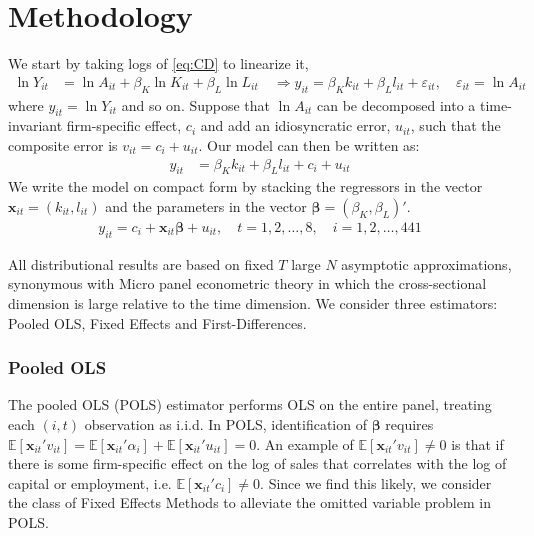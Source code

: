 \section{Methodology} \label{sec:methodology}

We start by taking logs of \eqref{eq:CD} to linearize it,
\begin{align*}
    \ln Y_{it} &= \ln A_{it} + \beta_K \ln K_{it} + \beta_L \ln L_{it} \quad \Longrightarrow
    y_{it} = \beta_K k_{it} + \beta_L l_{it} + \varepsilon_{it}, \quad \varepsilon_{it} = \ln A_{it}
\end{align*}
where $y_{it} = \ln Y_{it}$ and so on. Suppose that $\ln A_{it}$ can be decomposed into a time-invariant firm-specific effect, $c_i$ and add an idiosyncratic error, $u_{it}$, such that the composite error is $v_{it} = c_i + u_{it}$. Our model can then be written as:
\begin{align*}
    y_{it} &= \beta_K k_{it} + \beta_L l_{it}+c_i + u_{it}
\end{align*}
We write the model on compact form by stacking the regressors in the vector $\bm{x}_{it} = (k_{it}, l_{it})$ and the parameters in the vector $\bm{\beta} = (\beta_K, \beta_L)'$.
\begin{align} \label{equationline}
    y_{it} = c_i + \bm{x}_{it} \bm{\beta} + u_{it}, \quad t=1,2,\ldots,8, \quad i=1,2,\ldots,441
\end{align}

All distributional results are based on fixed $T$ large $N$ asymptotic approximations, synonymous with Micro panel econometric theory in which the cross-sectional dimension is large relative to the time dimension. We consider three estimators: Pooled OLS, Fixed Effects and First-Differences.  

\subsubsection*{Pooled OLS}
The pooled OLS (POLS) estimator performs OLS on the entire panel, treating each $(i,t)$ observation as i.i.d. In POLS, identification of $\pmb{\beta}$ requires  $\mathbb{E}[\pmb{x}_{it}'v_{it}]=\mathbb{E}[\pmb{x}_{it}'\alpha_{i}]+\mathbb{E}[\pmb{x}_{it}'u_{it}]=0$.
An example of $\mathbb{E}[\pmb{x}_{it}'v_{it}]\neq0$ is that if there is some firm-specific effect on the log of sales that correlates with the log of capital or employment, i.e. $\mathbb{E}[\pmb{x}_{it}'c_{i}]\neq0$. Since we find this likely, we consider the class of Fixed Effects Methods to alleviate the omitted variable problem in POLS.

